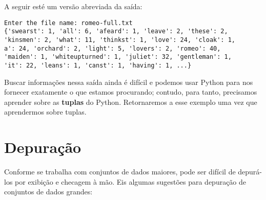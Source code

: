 A seguir esté um versão abreviada da saída:

\beforeverb
\begin{verbatim}
Enter the file name: romeo-full.txt
{'swearst': 1, 'all': 6, 'afeard': 1, 'leave': 2, 'these': 2,
'kinsmen': 2, 'what': 11, 'thinkst': 1, 'love': 24, 'cloak': 1,
a': 24, 'orchard': 2, 'light': 5, 'lovers': 2, 'romeo': 40,
'maiden': 1, 'whiteupturned': 1, 'juliet': 32, 'gentleman': 1,
'it': 22, 'leans': 1, 'canst': 1, 'having': 1, ...}
\end{verbatim}
\afterverb
%
Buscar informações nessa saída ainda é difícil e podemos usar Python para nos fornecer exatamente o que estamos procurando; contudo, para tanto, precisamos aprender sobre as {\bf tuplas} do Python. Retornaremos a esse exemplo uma vez que aprendermos sobre tuplas.

\section{Depuração}

Conforme se trabalha com conjuntos de dados maiores, pode ser difícil de depurá-los por exibição e checagem à mão. Eis algumas sugestões para depuração de conjuntos de dados grandes:

